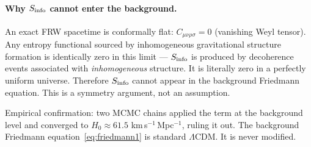 \documentclass[12pt,a4paper]{article}
\begin{document}
\paragraph{Why $S_{\rm info}$ cannot enter the background.}
An exact FRW spacetime is conformally flat: $C_{\mu\nu\rho\sigma} = 0$
(vanishing Weyl tensor). Any entropy functional sourced by inhomogeneous
gravitational structure formation is identically zero in this limit ---
$S_{\rm info}$ is produced by decoherence events associated with
\textit{inhomogeneous} structure. It is literally zero in a perfectly uniform
universe. Therefore $S_{\rm info}$ cannot appear in the background Friedmann
equation. This is a symmetry argument, not an assumption.

Empirical confirmation: two MCMC chains applied the term at the background level
and converged to $H_0 \approx 61.5$ km\,s$^{-1}$\,Mpc$^{-1}$, ruling it out.
The background Friedmann equation~\eqref{eq:friedmann1} is standard $\Lambda$CDM.
It is never modified.
\end{document}
